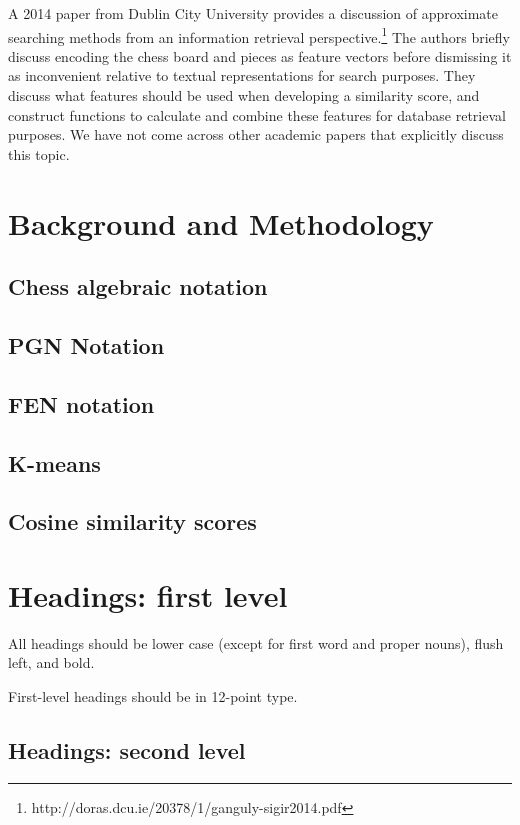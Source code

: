 \documentclass{article}
\begin{document}
 A 2014 paper from Dublin City University provides a discussion of approximate searching methods from an information retrieval perspective.\footnote{http://doras.dcu.ie/20378/1/ganguly-sigir2014.pdf} The authors briefly discuss encoding the chess board and pieces as feature vectors before dismissing it as inconvenient relative to textual representations for search purposes. They discuss what features should be used when developing a similarity score, and construct functions to calculate and combine these features for database retrieval purposes. We have not come across other academic papers that explicitly discuss this topic.

\section{Background and Methodology}

\subsection{Chess algebraic notation}
\subsection{PGN Notation}
\subsection{FEN notation}
\subsection{K-means}
\subsection{Cosine similarity scores}


\section{Headings: first level}
\label{headings}

All headings should be lower case (except for first word and proper nouns),
flush left, and bold.

First-level headings should be in 12-point type.

\subsection{Headings: second level}
\end{document}
